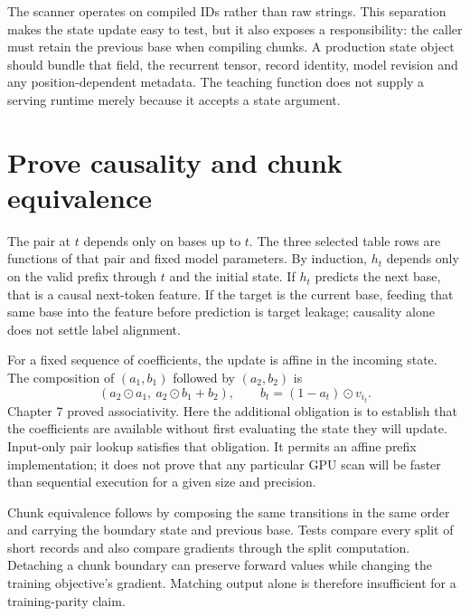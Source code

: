 The scanner operates on compiled IDs rather than raw strings. This separation
makes the state update easy to test, but it also exposes a responsibility:
the caller must retain the previous base when compiling chunks. A production
state object should bundle that field, the recurrent tensor, record identity,
model revision and any position-dependent metadata. The teaching function
does not supply a serving runtime merely because it accepts a state argument.

\section{Prove causality and chunk equivalence}
The pair at $t$ depends only on bases up to $t$. The three selected table rows
are functions of that pair and fixed model parameters. By induction,
$h_t$ depends only on the valid prefix through $t$ and the initial state.
If $h_t$ predicts the next base, that is a causal next-token feature. If the
target is the current base, feeding that same base into the feature before
prediction is target leakage; causality alone does not settle label alignment.


For a fixed sequence of coefficients, the update is affine in the incoming
state. The composition of $(a_1,b_1)$ followed by $(a_2,b_2)$ is
\begin{equation}
 (a_2\odot a_1,\ a_2\odot b_1+b_2),\qquad b_t=(1-a_t)\odot v_{i_t}.
\end{equation}
Chapter 7 proved associativity. Here the additional obligation is to establish
that the coefficients are available without first evaluating the state they
will update. Input-only pair lookup satisfies that obligation. It permits an
affine prefix implementation; it does not prove that any particular GPU scan
will be faster than sequential execution for a given size and precision.

Chunk equivalence follows by composing the same transitions in the same order
and carrying the boundary state and previous base. Tests compare every split
of short records and also compare gradients through the split computation.
Detaching a chunk boundary can preserve forward values while changing the
training objective's gradient. Matching output alone is therefore insufficient
for a training-parity claim.

